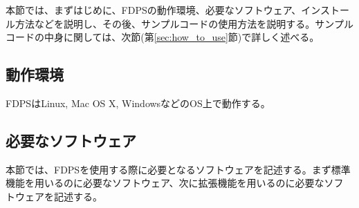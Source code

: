 本節では、まずはじめに、FDPSの動作環境、必要なソフトウェア、インストール方法などを説明し、その後、サンプルコードの使用方法を説明する。サンプルコードの中身に関しては、次節(第\ref{sec:how_to_use}節)で詳しく述べる。

\subsection{動作環境}
FDPSはLinux, Mac OS X, WindowsなどのOS上で動作する。

\subsection{必要なソフトウェア}
本節では、FDPSを使用する際に必要となるソフトウェアを記述する。まず標準
機能を用いるのに必要なソフトウェア、次に拡張機能を用いるのに必要なソフ
トウェアを記述する。
